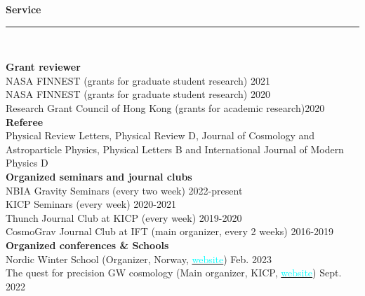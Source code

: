 \documentclass[11pt,a4paper]{article}
\newcommand{\secsizesmall}{0.05\linewidth}
\newcommand{\contsizelong}{0.95\linewidth}
\newcommand{\sectionsep}{12pt}
\newcounter{seminars}
\begin{document}
\newpage
\vspace{\sectionsep}
\textbf{Service} \vspace{-8pt}\\ {\rule{\linewidth}{0.6pt}}\vspace{5pt}\\
\begin{minipage}[t]{\secsizesmall}
\begin{flushleft}
\end{flushleft}
\end{minipage}
\begin{minipage}[t]{\contsizelong}
\begin{flushleft}
\textbf{Grant reviewer} \\
NASA FINNEST (grants for graduate student research) \hfill 2021 \\
NASA FINNEST (grants for graduate student research) \hfill 2020 \\
Research Grant Council of Hong Kong  (grants for academic research)\hfill 2020 \\
\vspace{5pt}
\textbf{Referee} \\ 
Physical Review Letters, Physical Review D, Journal of Cosmology and Astroparticle Physics, Physical Letters B and International Journal of Modern Physics D \\
\vspace{5pt}
\textbf{Organized seminars and journal clubs} \\ 
NBIA Gravity Seminars (every two week) \hfill 2022-present\\
KICP Seminars (every week) \hfill 2020-2021\\
Thunch Journal Club at KICP (every week) \hfill 2019-2020\\
CosmoGrav Journal Club at IFT (main organizer, every 2 weeks) \hfill 2016-2019\\
\vspace{5pt}
\textbf{Organized conferences \& Schools} \\ 
Nordic Winter School (Organizer, Norway, \href{https://indico.nbi.ku.dk/event/1903/}{\textcolor{cyan}{website}}) \hfill Feb. 2023 \\
The quest for precision GW cosmology (Main organizer, KICP, \href{https://kicp-workshops.uchicago.edu/2022gw-cosmo/}{\textcolor{cyan}{website}}) \hfill Sept. 2022 \\

\end{flushleft}
\end{minipage}
\end{document}
